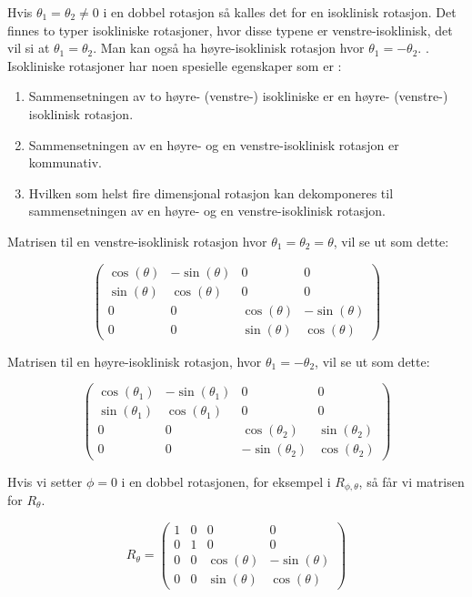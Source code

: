 \documentclass[a4paper,10pt,english]{article}
\begin{document}
    Hvis $\theta_{1} = \theta_{2} \neq 0$ i en dobbel rotasjon så kalles det for en isoklinisk rotasjon. Det finnes to typer isokliniske rotasjoner, hvor disse typene er venstre-isoklinisk, det vil si at $\theta_{1} = \theta_{2}$.
    Man kan også ha høyre-isoklinisk rotasjon hvor $\theta_{1} = -\theta_{2}$. \cite{rotationsapp}. Isokliniske rotasjoner har noen spesielle egenskaper som er \cite{rotationsapp}:

    \begin{enumerate}
        \item Sammensetningen av to høyre- (venstre-) isokliniske er en høyre- (venstre-) isoklinisk rotasjon.
        \item Sammensetningen av en høyre- og en venstre-isoklinisk rotasjon er kommunativ.
        \item Hvilken som helst fire dimensjonal rotasjon kan dekomponeres til sammensetningen av en høyre- og en venstre-isoklinisk rotasjon.
    \end{enumerate}

    Matrisen til en venstre-isoklinisk rotasjon hvor $\theta_{1} = \theta_{2} = \theta$, vil se ut som dette:

    $$
    \left(
    \begin{matrix}
        \cos(\theta) & -\sin(\theta) & 0 & 0 \\
        \sin(\theta) &  \cos(\theta) & 0 & 0 \\
        0 & 0 & \cos(\theta) & -\sin(\theta) \\
        0 & 0 & \sin(\theta) &  \cos(\theta)
    \end{matrix}
    \right)
    $$

    Matrisen til en høyre-isoklinisk rotasjon, hvor $\theta_{1} = -\theta_{2}$, vil se ut som dette:

    $$
    \left(
    \begin{matrix}
        \cos(\theta_{1}) & -\sin(\theta_{1}) & 0 & 0 \\
        \sin(\theta_{1}) &  \cos(\theta_{1}) & 0 & 0 \\
        0 & 0 &  \cos(\theta_{2}) & \sin(\theta_{2}) \\
        0 & 0 & -\sin(\theta_{2}) & \cos(\theta_{2})
    \end{matrix}
    \right)
    $$

    Hvis vi setter $\phi = 0$ i en dobbel rotasjonen, for eksempel i $R_{\phi, \theta}$, så får vi matrisen for $R_{\theta}$.

    $$
    R_{\theta} = \left(
    \begin{matrix}
        1 & 0 & 0 & 0 \\
        0 & 1 & 0 & 0 \\
        0 & 0 & \cos(\theta) & -\sin(\theta) \\
        0 & 0 & \sin(\theta) &  \cos(\theta)
    \end{matrix}
    \right)
    $$
\end{document}
